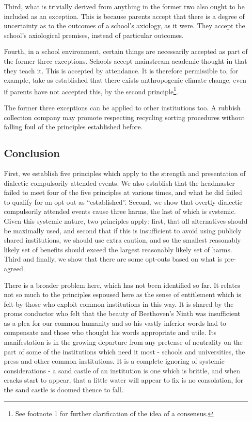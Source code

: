 \documentclass[10pt,a4paper]{article}
\begin{document}
\begin{multicols}{2}
	Third, what is trivially derived from anything in the former two also
	ought to be included as an exception. This is because parents accept
	that there is a degree of uncertainty as to the outcomes of a school's
	axiology, as it were. They accept the school's axiological premises,
	instead of particular outcomes.
	
	Fourth, in a school environment, certain things are necessarily accepted
	as part of the former three exceptions. Schools accept mainstream
	academic thought in that they teach it. This is accepted by attendance.
	It is therefore permissible to, for example, take as established that
	there exists anthropogenic climate change, even if parents have not
	accepted this, by the second principle\footnote{See footnote 1 for
		further clarification of the idea of a consensus.}.
	
	The former three exceptions can be applied to other institutions too. A
	rubbish collection company may promote respecting recycling sorting
	procedures without falling foul of the principles established before.
	
	\subsection{Conclusion}\label{conclusion}
	
	First, we establish five principles which apply to the strength and
	presentation of dialectic compulsorily attended events. We also
	establish that the headmaster failed to meet four of the five principles
	at various times, and what he did failed to qualify for an opt-out as
	``established''. Second, we show that overtly dialectic compulsorily
	attended events cause three harms, the last of which is systemic. Given
	this systemic nature, two principles apply: first, that all alternatives
	should be maximally used, and second that if this is insufficient to
	avoid using publicly shared institutions, we should use extra caution,
	and so the smallest reasonably likely set of benefits should exceed the
	largest reasonably likely set of harms. Third and finally, we show that
	there are some opt-outs based on what is pre-agreed.
	
	There is a broader problem here, which has not been identified so far.
	It relates not so much to the principles espoused here as the sense of
	entitlement which is felt by those who exploit common institutions in
	this way. It is shared by the proms conductor who felt that the beauty
	of Beethoven's Ninth was insufficient as a plea for our common humanity
	and so his vastly inferior words had to compensate and those who thought
	his words appropriate and utile. Its manifestation is in the growing
	departure from any pretense of neutrality on the part of some of the
	institutions which need it most - schools and universities, the press
	and other common institutions. It is a complete ignoring of systemic
	considerations - a sand castle of an institution is one which is
	brittle, and when cracks start to appear, that a little water will
	appear to fix is no consolation, for the sand castle is doomed thence to
	fall.

\end{multicols}
\end{document}
